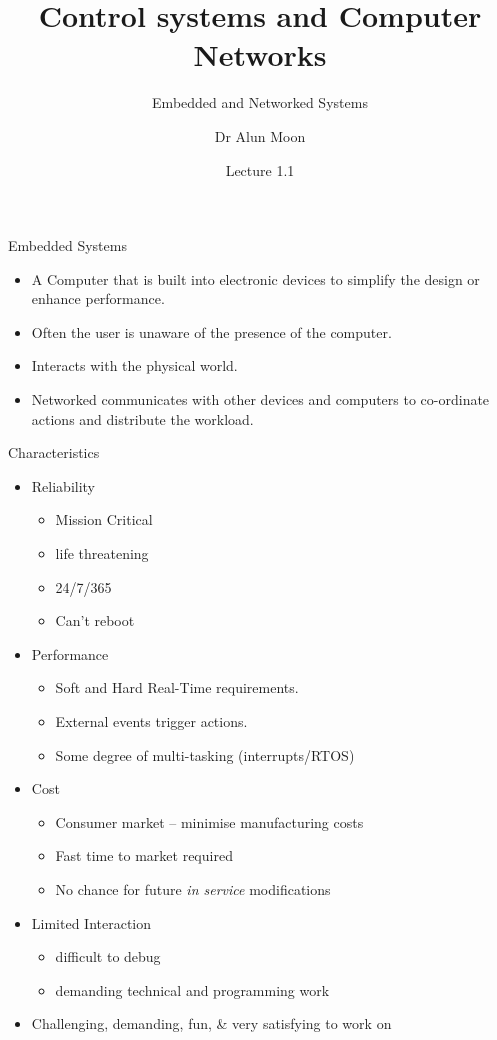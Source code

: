 \documentclass[xcolor=svgnames]{beamer}
\title{Control systems and Computer Networks}
\subtitle{Embedded and Networked Systems}
\author{Dr Alun Moon}
\date{Lecture 1.1}
\begin{document}
\frame{\maketitle}

\begin{frame}{Embedded Systems}
  \begin{itemize}[<+->]
  \item A \alert{Computer} that is built into \alert{electronic devices} to
        simplify the design or enhance performance.
  \item Often the user is unaware of the presence of the computer.
  \item Interacts with  the physical world.
  \item \alert{Networked} communicates with other devices and computers to
        co-ordinate actions and distribute the workload.
\end{itemize}
\end{frame}

\begin{frame}{Characteristics}
\begin{itemize}[<+->]
  \item Reliability
  \begin{itemize}
    \item Mission Critical
    \item life threatening
    \item 24/7/365
    \item Can't reboot
  \end{itemize}
    \item Performance
    \begin{itemize}
      \item \alert{Soft} and \alert{Hard} Real-Time requirements.
      \item External events trigger actions.
      \item Some degree of multi-tasking (interrupts/RTOS)
      \end{itemize}
    \item Cost
    \begin{itemize}
      \item Consumer market -- minimise manufacturing costs
      \item Fast time to market required
      \item No chance for future \emph{in service} modifications
    \end{itemize}
    \item Limited Interaction
    \begin{itemize}
      \item difficult to debug
      \item demanding technical and programming work
    \end{itemize}
    \item \colorbox{NUblue!40}{Challenging, demanding, fun, \& very satisfying to work on}
\end{itemize}
\end{frame}
\end{document}
